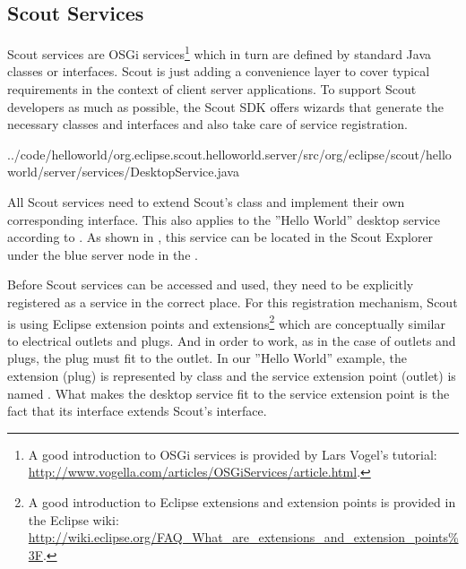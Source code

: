 \documentclass[a4paper,10pt,twoside]{book}
\begin{document}
\subsection{Scout Services}

Scout services are OSGi services\footnote{
A good introduction to OSGi services is provided by Lars Vogel's tutorial: \url{http://www.vogella.com/articles/OSGiServices/article.html}.
}
which in turn are defined by standard Java classes or interfaces.
Scout is just adding a convenience layer to cover typical requirements in the context of client server applications. 
To support Scout developers as much as possible, the Scout SDK offers wizards that generate the necessary classes and interfaces and also take care of service registration.


{../code/helloworld/org.eclipse.scout.helloworld.server/src/org/eclipse/scout/helloworld/server/services/DesktopService.java}

All Scout services need to extend Scout's  class and implement their own corresponding interface.
This also applies to the ''Hello World'' desktop service according to .
As shown in , this service can be located in the Scout Explorer under the blue server node in the .

Before Scout services can be accessed and used, they need to be explicitly registered as a service in the correct place.
For this registration mechanism, Scout is using Eclipse extension points and extensions\footnote{
A good introduction to Eclipse extensions and extension points is provided in the Eclipse wiki: \url{http://wiki.eclipse.org/FAQ_What_are_extensions_and_extension_points\%3F}.
}
which are conceptually similar to electrical outlets and plugs.
And in order to work, as in the case of outlets and plugs, the plug must fit to the outlet.
In our ''Hello World'' example, the extension (plug) is represented by class  and the service extension point (outlet) is named .
What makes the desktop service fit to the service extension point is the fact that its interface  extends Scout's  interface.
\end{document}
